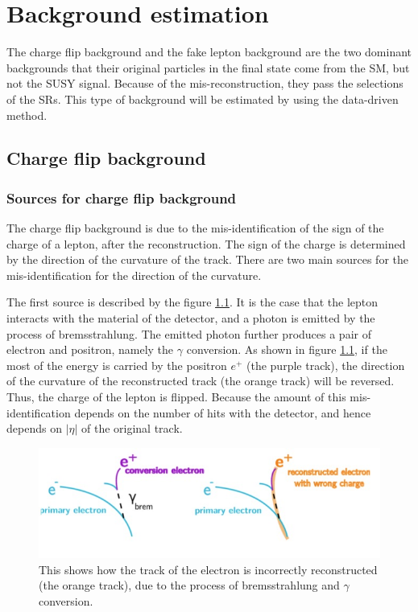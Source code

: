 \chapter{Background estimation}
\label{ch:BG}

The charge flip background and the fake lepton background are the two dominant backgrounds that their original particles in the final state come from the SM, but not the SUSY signal. Because of the mis-reconstruction, they pass the selections of the SRs. This type of background will be estimated by using the data-driven method.

\section{Charge flip background}
\label{sec:charge_flip_background}
\subsection{Sources for charge flip background}
The charge flip background is due to the mis-identification of the sign of the charge of a lepton, after the reconstruction.
The sign of the charge is determined by the direction of the curvature of the track.
There are two main sources for the mis-identification for the direction of the curvature.

The first source is described by the figure \ref{fig:charge_flip_bremsstrahlung}.
It is the case that the lepton interacts with the material of the detector, and a photon is emitted by the process of bremsstrahlung.
The emitted photon further produces a pair of electron and positron, namely the $\gamma$ conversion.
As shown in figure \ref{fig:charge_flip_bremsstrahlung}, if the most of the energy is carried by the positron $e^{+}$ (the purple track), the direction of the curvature of the reconstructed track (the orange track) will be reversed.
Thus, the charge of the lepton is flipped.
Because the amount of this mis-identification depends on the number of hits with the detector, and hence depends on $|\eta|$ of the original track.

\begin{figure}
\centering
\includegraphics[width=\textwidth]{data/photo/charge_flip/Brem.jpg}
\caption{This shows how the track of the electron is incorrectly reconstructed (the orange track), due to the process of bremsstrahlung and $\gamma$ conversion.}
\label{fig:charge_flip_bremsstrahlung}
\end{figure}

